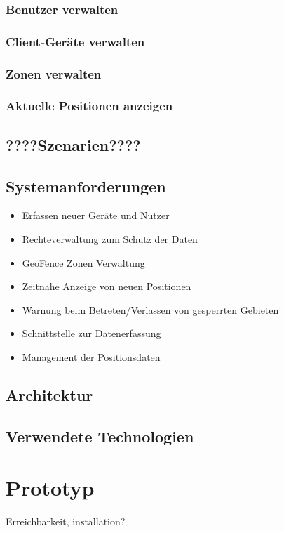 \documentclass[
    11pt,               %
    a4paper,            %
    headsepline,        %
    foodsepline,        %
    cleardoubleplain,   %
    liststotoc,         %
    bibtotoc,           %
]%
{article}
\begin{document}
\subsubsection*{Benutzer verwalten}

\subsubsection*{Client-Geräte verwalten}

\subsubsection*{Zonen verwalten}

\subsubsection*{Aktuelle Positionen anzeigen}


\subsection{????Szenarien????}

\subsection{Systemanforderungen}
\begin{itemize}
\item Erfassen neuer Geräte und Nutzer
\item Rechteverwaltung zum Schutz der Daten
\item GeoFence Zonen Verwaltung
\item Zeitnahe Anzeige von neuen Positionen
\item Warnung beim Betreten/Verlassen von gesperrten Gebieten
\item Schnittstelle zur Datenerfassung
\item Management der Positionsdaten
\end{itemize}
\subsection{Architektur}

\subsection{Verwendete Technologien}

\section{Prototyp}
Erreichbarkeit, installation?
\end{document}
